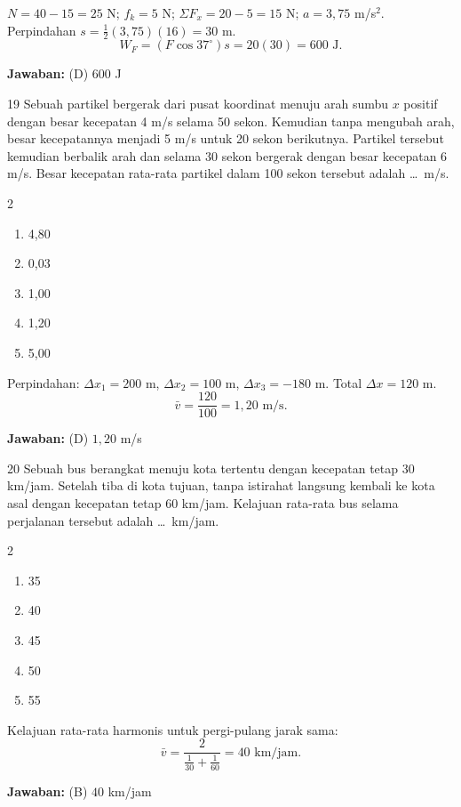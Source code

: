 \documentclass[11pt]{article}
\newenvironment{pilB}{%
  \par\smallskip\begin{multicols}{2}
  \begin{enumerate}[label=(\Alph*),leftmargin=*,itemsep=1pt,topsep=3pt]}%
  {\end{enumerate}\end{multicols}}
\newcommand{\jawaban}[1]{%
  \noindent\colorbox{gold!30}{\parbox{\dimexpr\linewidth-2\fboxsep\relax}{%
    \textbf{Jawaban:} #1}}\par\smallskip}
\begin{document}
\begin{pembox}
$N=40-15=25$ N; $f_k=5$ N; $\Sigma F_x=20-5=15$ N; $a=3{,}75$ m/s$^2$. Perpindahan $s=\tfrac{1}{2}(3{,}75)(16)=30$ m.
\[W_F=(F\cos 37^\circ)s=20(30)=600\text{ J.}\]
\jawaban{(D) $600$ J}
\end{pembox}

\begin{soal}{19}
Sebuah partikel bergerak dari pusat koordinat menuju arah sumbu $x$
positif dengan besar kecepatan 4 m/s selama 50 sekon. Kemudian tanpa
mengubah arah, besar kecepatannya menjadi 5 m/s untuk 20 sekon
berikutnya. Partikel tersebut kemudian berbalik arah dan selama 30 sekon
bergerak dengan besar kecepatan 6 m/s. Besar kecepatan rata-rata
partikel dalam 100 sekon tersebut adalah \ldots\ m/s.
\begin{pilB}
  \item 4,80 \item 0,03 \item 1,00 \item 1,20 \item 5,00
\end{pilB}
\end{soal}

\begin{pembox}
Perpindahan: $\Delta x_1=200$ m, $\Delta x_2=100$ m, $\Delta x_3=-180$ m. Total $\Delta x=120$ m.
\[\bar v=\frac{120}{100}=1{,}20\text{ m/s.}\]
\jawaban{(D) $1{,}20$ m/s}
\end{pembox}

\begin{soal}{20}
Sebuah bus berangkat menuju kota tertentu dengan kecepatan tetap
30 km/jam. Setelah tiba di kota tujuan, tanpa istirahat langsung kembali
ke kota asal dengan kecepatan tetap 60 km/jam. Kelajuan rata-rata bus
selama perjalanan tersebut adalah \ldots\ km/jam.
\begin{pilB}
  \item 35 \item 40 \item 45 \item 50 \item 55
\end{pilB}
\end{soal}

\begin{pembox}
Kelajuan rata-rata harmonis untuk pergi-pulang jarak sama:
\[\bar v=\frac{2}{\frac{1}{30}+\frac{1}{60}}=40\text{ km/jam.}\]
\jawaban{(B) $40$ km/jam}
\end{pembox}
\end{document}
